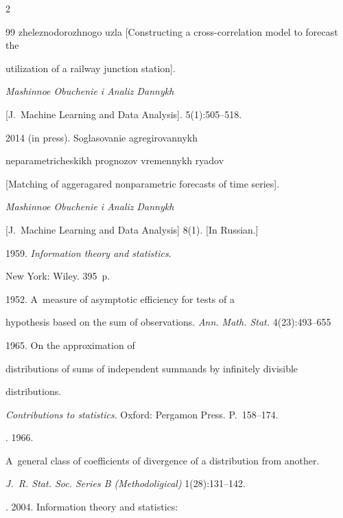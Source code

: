 \begin{multicols}{2}
{{\begin{thebibliography}{99}
zheleznodorozhnogo uzla [Constructing a cross-correlation model to forecast the

utilization of a railway junction station].

\textit{Mashinnoe Obuchenie i Analiz Dannykh}

[J.~Machine Learning and Data Analysis]. 5(1):505--518.




  2014 (in press). Soglasovanie agregirovannykh

neparametricheskikh prognozov vremennykh ryadov

[Matching of aggeragared nonparametric forecasts of time series].

\textit{Mashinnoe Obuchenie i Analiz Dannykh}

[J.~Machine Learning and Data Analysis] 8(1). [In Russian.]



\columnbreak




  1959. \textit{Information theory and statistics}.

New York: Wiley. 395~p.


 1952. A~measure of asymptotic efficiency for tests of a

hypothesis based on the sum of observations. \textit{Ann. Math. Stat.} 4(23):493--655


 1965. On the approximation of

distributions of sums of independent summands by infinitely divisible

distributions.

\textit{Contributions to statistics}. Oxford: Pergamon Press. P.~158--174.


. 1966.

A~general class of coefficients of divergence of a distribution from another.

\textit{J.~R. Stat. Soc. Series B (Methodoligical)} 1(28):131--142.


. 2004. Information theory and statistics:


\end{thebibliography}}}
\end{multicols}
